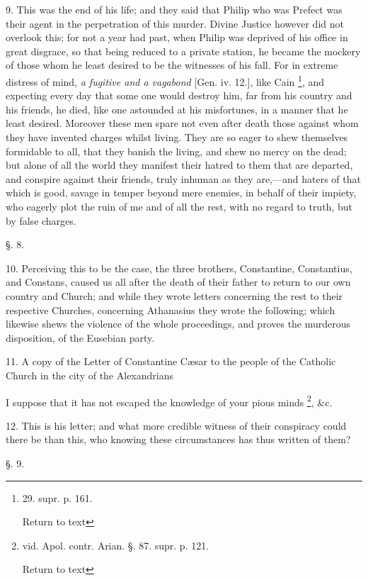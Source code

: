 9. This was the end of his life; and they said
that Philip who was Prefect was their agent in the perpetration of
this murder. Divine Justice however did not overlook this; for not a
year had past, when Philip was deprived of his office in great
disgrace, so that being reduced to a private station, he became the
mockery of those whom he least desired to be the witnesses of his
fall. For in extreme distress of mind, \emph{a fugitive and a vagabond}
[Gen. iv. 12.], like Cain \footnote{29.
supr. p. 161.

Return to text},
and expecting every day that some one would destroy him, far from his
country and his friends, he died, like one astounded at his
misfortunes, in a manner that he least desired. Moreover these men
spare not even after death those against whom they have invented
charges whilst living. They are so eager to shew themselves formidable
to all, that they banish the living, and shew no mercy on the dead;
but alone of all the world they manifest their hatred to them
that are departed, and conspire against their friends, truly inhuman
as they are,—and haters of that which is good, savage in temper
beyond mere enemies, in behalf of their impiety, who eagerly plot the
ruin of me and of all the rest, with no regard to truth, but by false
charges.

§. 8.

10. Perceiving this to be the case, the three
brothers, Constantine, Constantius, and Constans, caused us all after
the death of their father to return to our own country and Church; and
while they wrote letters concerning the rest to their respective
Churches, concerning Athanasius they wrote the following; which
likewise shews the violence of the whole proceedings, and proves the
murderous disposition, of the Eusebian party.

11. A copy of the Letter of Constantine Cæsar to
the people of the Catholic Church in the city of the Alexandrians

I suppose that it has not escaped the knowledge
of your pious minds \footnote{vid. Apol.
contr. Arian. §.
87. supr. p. 121.

Return to text},
\&c.

12. This is his letter; and what more credible
witness of their conspiracy could there be than this, who knowing
these circumstances has thus written of them?


§. 9.

